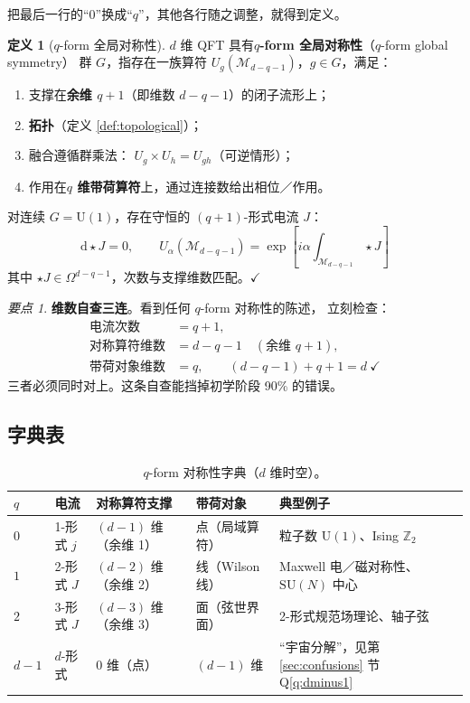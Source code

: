 \documentclass[UTF8,a4paper,11pt]{ctexart}
\theoremstyle{plain}
\theoremstyle{definition}
\newtheorem{definition}{定义}[section]
\theoremstyle{remark}
\newtheorem{keypoint}{要点}[section]
\newcommand{\ext}{\mathrm{d}}          %
\newcommand{\hs}{\star}                %
\newcommand{\ZZ}{\mathbb{Z}}
\newcommand{\Uone}{\mathrm{U}(1)}
\newcommand{\SUgrp}{\mathrm{SU}}
\newcommand{\Mfd}{\mathcal{M}}
\newcommand{\en}[1]{\textsf{#1}}       %
\newcommand{\Uop}{U}
\begin{document}
把最后一行的“$0$”换成“$q$”，其他各行随之调整，就得到定义。

\begin{definition}[$q$-form 全局对称性]
\label{def:qform}
$d$ 维 QFT 具有\textbf{$q$-form 全局对称性}（\en{$q$-form global symmetry}）
群 $G$，指存在一族算符 $\Uop_g(\Mfd_{d-q-1})$，$g\in G$，满足：
\begin{enumerate}[label=(\arabic*)]
  \item 支撑在\textbf{余维 $q+1$}（即维数 $d-q-1$）的闭子流形上；
  \item \textbf{拓扑}（定义 \ref{def:topological}）；
  \item 融合遵循群乘法：
        $\Uop_g\times \Uop_h=\Uop_{gh}$（可逆情形）；
  \item 作用在\textbf{$q$ 维带荷算符}上，通过连接数给出相位／作用。
\end{enumerate}
对连续 $G=\Uone$，存在守恒的 $(q+1)$-形式电流 $J$：
\begin{equation}
  \boxed{\ \ext\hs J=0,
  \qquad
  \Uop_\alpha(\Mfd_{d-q-1})
  =\exp\!\left[i\alpha\!\int_{\Mfd_{d-q-1}}\hs J\right]\ }
  \label{eq:qformop}
\end{equation}
其中 $\hs J\in\Omega^{d-q-1}$，次数与支撑维数匹配。$\checkmark$
\end{definition}

\begin{keypoint}
\label{kp:dimensioncheck}
\textbf{维数自查三连}。看到任何 $q$-form 对称性的陈述，
立刻检查：
\begin{align}
  \text{电流次数}&=q+1, \\
  \text{对称算符维数}&=d-q-1
  \quad(\text{余维 } q+1), \\
  \text{带荷对象维数}&=q,
  \qquad (d-q-1)+q+1=d\ \checkmark
\end{align}
三者必须同时对上。这条自查能挡掉初学阶段 90\% 的错误。
\end{keypoint}

\subsection{字典表}

\begin{table}[htbp]
\centering
\caption{$q$-form 对称性字典（$d$ 维时空）。}
\label{tab:pform}
\begin{tabular}{@{}lllll@{}}
\toprule
$q$ & 电流 & 对称算符支撑 & 带荷对象 & 典型例子 \\
\midrule
$0$ & 1-形式 $j$ & $(d-1)$ 维（余维 1） & 点（局域算符）
    & 粒子数 $\Uone$、Ising $\ZZ_2$ \\
$1$ & 2-形式 $J$ & $(d-2)$ 维（余维 2） & 线（Wilson 线）
    & Maxwell 电／磁对称性、$\SUgrp(N)$ 中心 \\
$2$ & 3-形式 $J$ & $(d-3)$ 维（余维 3） & 面（弦世界面）
    & 2-形式规范场理论、轴子弦 \\
$d-1$ & $d$-形式 & $0$ 维（点） & $(d-1)$ 维
    & “宇宙分解”，见第 \ref{sec:confusions} 节 Q\ref{q:dminus1} \\
\bottomrule
\end{tabular}
\end{table}
\end{document}
